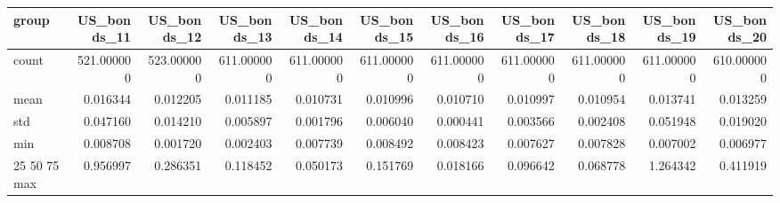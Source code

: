 \begin{tabular}{lrrrrrrrrrr}
\toprule
group & US_bonds_11 & US_bonds_12 & US_bonds_13 & US_bonds_14 & US_bonds_15 & US_bonds_16 & US_bonds_17 & US_bonds_18 & US_bonds_19 & US_bonds_20 \\
\midrule
count & 521.000000 & 523.000000 & 611.000000 & 611.000000 & 611.000000 & 611.000000 & 611.000000 & 611.000000 & 611.000000 & 610.000000 \\
mean & 0.016344 & 0.012205 & 0.011185 & 0.010731 & 0.010996 & 0.010710 & 0.010997 & 0.010954 & 0.013741 & 0.013259 \\
std & 0.047160 & 0.014210 & 0.005897 & 0.001796 & 0.006040 & 0.000441 & 0.003566 & 0.002408 & 0.051948 & 0.019020 \\
min & 0.008708 & 0.001720 & 0.002403 & 0.007739 & 0.008492 & 0.008423 & 0.007627 & 0.007828 & 0.007002 & 0.006977 \\
25%
50%
75%
max & 0.956997 & 0.286351 & 0.118452 & 0.050173 & 0.151769 & 0.018166 & 0.096642 & 0.068778 & 1.264342 & 0.411919 \\
\bottomrule
\end{tabular}
